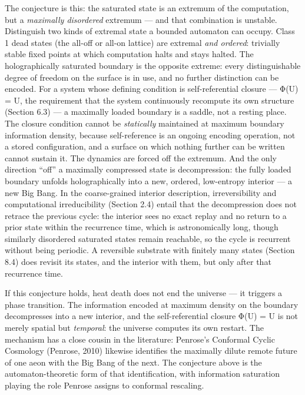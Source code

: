 \documentclass[
]{article}
\begin{document}
The conjecture is this: the saturated state is an extremum of the
computation, but a \emph{maximally disordered} extremum --- and that
combination is unstable. Distinguish two kinds of extremal state a
bounded automaton can occupy. Class 1 dead states (the all-off or all-on
lattice) are extremal \emph{and ordered}: trivially stable fixed points
at which computation halts and stays halted. The holographically
saturated boundary is the opposite extreme: every distinguishable degree
of freedom on the surface is in use, and no further distinction can be
encoded. For a system whose defining condition is self-referential
closure --- Φ(U) = U, the requirement that the system continuously
recompute its own structure (Section 6.3) --- a maximally loaded
boundary is a saddle, not a resting place. The closure condition cannot
be \emph{statically} maintained at maximum boundary information density,
because self-reference is an ongoing encoding operation, not a stored
configuration, and a surface on which nothing further can be written
cannot sustain it. The dynamics are forced off the extremum. And the
only direction ``off'' a maximally compressed state is decompression:
the fully loaded boundary unfolds holographically into a new, ordered,
low-entropy interior --- a new Big Bang. In the coarse-grained interior
description, irreversibility and computational irreducibility (Section
2.4) entail that the decompression does not retrace the previous cycle:
the interior sees no exact replay and no return to a prior state within
the recurrence time, which is astronomically long, though similarly
disordered saturated states remain reachable, so the cycle is recurrent
without being periodic. A reversible substrate with finitely many states
(Section 8.4) does revisit its states, and the interior with them, but
only after that recurrence time.

If this conjecture holds, heat death does not end the universe --- it
triggers a phase transition. The information encoded at maximum density
on the boundary decompresses into a new interior, and the
self-referential closure Φ(U) = U is not merely spatial but
\emph{temporal}: the universe computes its own restart. The mechanism
has a close cousin in the literature: Penrose's Conformal Cyclic
Cosmology (Penrose, 2010) likewise identifies the maximally dilute
remote future of one aeon with the Big Bang of the next. The conjecture
above is the automaton-theoretic form of that identification, with
information saturation playing the role Penrose assigns to conformal
rescaling.
\end{document}
